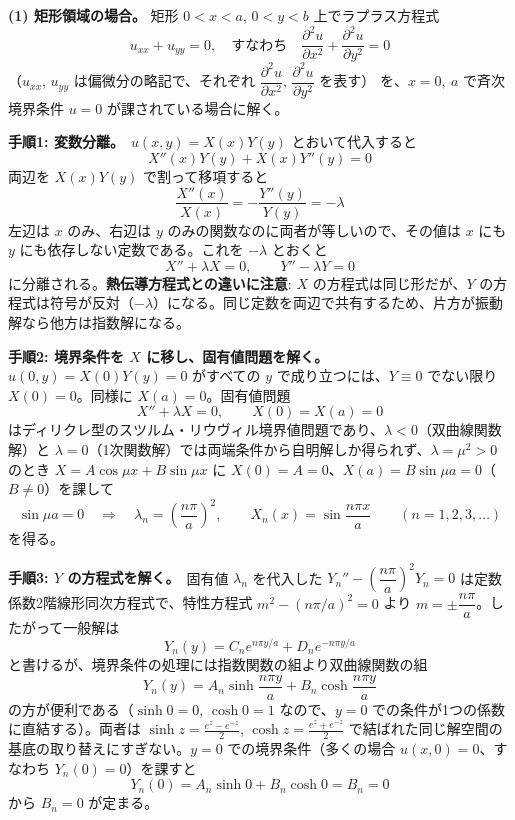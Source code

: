 \documentclass[a4paper,11pt]{article}
\begin{document}


\noindent
\textbf{(1) 矩形領域の場合。}
矩形 $0 < x < a$, $0 < y < b$ 上でラプラス方程式
\[
u_{xx} + u_{yy} = 0,
\quad\text{すなわち}\quad
\frac{\partial^{2} u}{\partial x^{2}} + \frac{\partial^{2} u}{\partial y^{2}} = 0
\]
（$u_{xx}$, $u_{yy}$ は偏微分の略記で、それぞれ $\dfrac{\partial^{2} u}{\partial x^{2}}$, $\dfrac{\partial^{2} u}{\partial y^{2}}$ を表す）
を、$x = 0,\ a$ で斉次境界条件 $u = 0$ が課されている場合に解く。

\medskip\noindent
\textbf{手順1: 変数分離。}\ $u(x,y) = X(x)Y(y)$ とおいて代入すると
\[
X''(x)Y(y) + X(x)Y''(y) = 0
\]
両辺を $X(x)Y(y)$ で割って移項すると
\[
\frac{X''(x)}{X(x)} = -\frac{Y''(y)}{Y(y)} = -\lambda
\]
左辺は $x$ のみ、右辺は $y$ のみの関数なのに両者が等しいので、その値は $x$ にも $y$ にも依存しない定数である。これを $-\lambda$ とおくと
\[
X'' + \lambda X = 0, \qquad Y'' - \lambda Y = 0
\]
に分離される。\textbf{熱伝導方程式との違いに注意}: $X$ の方程式は同じ形だが、$Y$ の方程式は符号が反対（$-\lambda$）になる。同じ定数を両辺で共有するため、片方が振動解なら他方は指数解になる。

\medskip\noindent
\textbf{手順2: 境界条件を $X$ に移し、固有値問題を解く。}\ $u(0,y) = X(0)Y(y) = 0$ がすべての $y$ で成り立つには、$Y \equiv 0$ でない限り $X(0) = 0$。同様に $X(a) = 0$。固有値問題
\[
X'' + \lambda X = 0, \qquad X(0) = X(a) = 0
\]
はディリクレ型のスツルム・リウヴィル境界値問題であり、$\lambda < 0$（双曲線関数解）と $\lambda = 0$（1次関数解）では両端条件から自明解しか得られず、$\lambda = \mu^2 > 0$ のとき $X = A\cos\mu x + B\sin\mu x$ に $X(0)=A=0$、$X(a) = B\sin\mu a = 0$（$B \neq 0$）を課して
\[
\sin\mu a = 0 \quad\Longrightarrow\quad
\lambda_n = \left(\frac{n\pi}{a}\right)^2, \qquad
X_n(x) = \sin\frac{n\pi x}{a} \qquad (n = 1, 2, 3, \dots)
\]
を得る。

\medskip\noindent
\textbf{手順3: $Y$ の方程式を解く。}\ 固有値 $\lambda_n$ を代入した $Y_n'' - \left(\dfrac{n\pi}{a}\right)^2 Y_n = 0$ は定数係数2階線形同次方程式で、特性方程式 $m^2 - (n\pi/a)^2 = 0$ より $m = \pm\dfrac{n\pi}{a}$。したがって一般解は
\[
Y_n(y) = C_n e^{n\pi y/a} + D_n e^{-n\pi y/a}
\]
と書けるが、境界条件の処理には指数関数の組より双曲線関数の組
\[
Y_n(y) = A_n \sinh\frac{n\pi y}{a} + B_n \cosh\frac{n\pi y}{a}
\]
の方が便利である（$\sinh 0 = 0$, $\cosh 0 = 1$ なので、$y=0$ での条件が1つの係数に直結する）。両者は $\sinh z = \frac{e^z - e^{-z}}{2}$, $\cosh z = \frac{e^z + e^{-z}}{2}$ で結ばれた同じ解空間の基底の取り替えにすぎない。$y = 0$ での境界条件（多くの場合 $u(x,0) = 0$、すなわち $Y_n(0) = 0$）を課すと
\[
Y_n(0) = A_n \sinh 0 + B_n \cosh 0 = B_n = 0
\]
から $B_n = 0$ が定まる。
\end{document}
